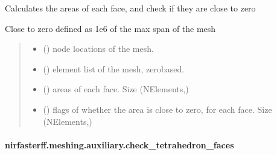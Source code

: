 \documentclass[letterpaper,10pt,english]{sphinxmanual}
\begin{document}
\begin{fulllineitems}
\label{\detokenize{_autosummary/nirfasterff.meshing.auxiliary.check_facearea:nirfasterff.meshing.auxiliary.check_facearea}}
\pysigstartsignatures
\pysiglinewithargsret
{}
{\sphinxparamcomma {}}
{}
\pysigstopsignatures
\sphinxAtStartPar
Calculates the areas of each face, and check if they are close to zero

\sphinxAtStartPar
Close to zero defined as 1e6 of the max span of the mesh
\begin{quote}\begin{description}
\begin{itemize}
\item {} 
\sphinxAtStartPar
{} () \textendash{} node locations of the mesh.

\item {} 
\sphinxAtStartPar
{} () \textendash{} element list of the mesh, zero\sphinxhyphen{}based.

\end{itemize}

\sphinxAtStartPar
\begin{itemize}
\item {} 
\sphinxAtStartPar
{} () \textendash{} areas of each face. Size (NElements,)

\item {} 
\sphinxAtStartPar
{} () \textendash{} flags of whether the area is close to zero, for each face. Size (NElements,)

\end{itemize}


\end{description}\end{quote}

\end{fulllineitems}


\sphinxstepscope


\paragraph{nirfasterff.meshing.auxiliary.check\_tetrahedron\_faces}
\label{\detokenize{_autosummary/nirfasterff.meshing.auxiliary.check_tetrahedron_faces:nirfasterff-meshing-auxiliary-check-tetrahedron-faces}}\label{\detokenize{_autosummary/nirfasterff.meshing.auxiliary.check_tetrahedron_faces::doc}}
\end{document}
